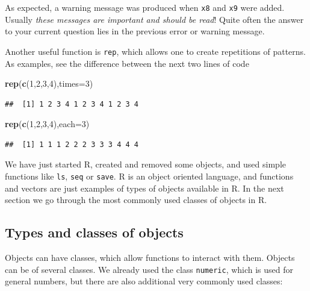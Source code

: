 \documentclass[
]{article}
\newenvironment{Shaded}{\begin{snugshade}}{\end{snugshade}}
\newcommand{\AttributeTok}[1]{\textcolor[rgb]{0.13,0.29,0.53}{#1}}
\newcommand{\DecValTok}[1]{\textcolor[rgb]{0.00,0.00,0.81}{#1}}
\newcommand{\FunctionTok}[1]{\textcolor[rgb]{0.13,0.29,0.53}{\textbf{#1}}}
\newcommand{\NormalTok}[1]{#1}
\begin{document}
As expected, a warning message was produced when \texttt{x8} and
\texttt{x9} were added. Usually \emph{these messages are important and
should be read}! Quite often the answer to your current question lies in
the previous error or warning message.

Another useful function is \texttt{rep}, which allows one to create
repetitions of patterns. As examples, see the difference between the
next two lines of code

\begin{Shaded}
\begin{Highlighting}[]
\FunctionTok{rep}\NormalTok{(}\FunctionTok{c}\NormalTok{(}\DecValTok{1}\NormalTok{,}\DecValTok{2}\NormalTok{,}\DecValTok{3}\NormalTok{,}\DecValTok{4}\NormalTok{),}\AttributeTok{times=}\DecValTok{3}\NormalTok{)}
\end{Highlighting}
\end{Shaded}

\begin{verbatim}
##  [1] 1 2 3 4 1 2 3 4 1 2 3 4
\end{verbatim}

\begin{Shaded}
\begin{Highlighting}[]
\FunctionTok{rep}\NormalTok{(}\FunctionTok{c}\NormalTok{(}\DecValTok{1}\NormalTok{,}\DecValTok{2}\NormalTok{,}\DecValTok{3}\NormalTok{,}\DecValTok{4}\NormalTok{),}\AttributeTok{each=}\DecValTok{3}\NormalTok{)}
\end{Highlighting}
\end{Shaded}

\begin{verbatim}
##  [1] 1 1 1 2 2 2 3 3 3 4 4 4
\end{verbatim}

We have just started R, created and removed some objects, and used
simple functions like \texttt{ls}, \texttt{seq} or \texttt{save}. R is
an object oriented language, and functions and vectors are just examples
of types of objects available in R. In the next section we go through
the most commonly used classes of objects in R.

\subsection{Types and classes of
objects}\label{types-and-classes-of-objects}

Objects can have classes, which allow functions to interact with them.
Objects can be of several classes. We already used the class
\texttt{numeric}, which is used for general numbers, but there are also
additional very commonly used classes:
\end{document}
